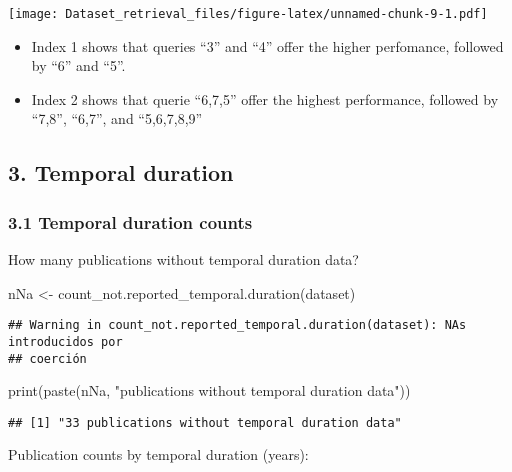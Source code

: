 \documentclass[
]{article}
\newenvironment{Shaded}{\begin{snugshade}}{\end{snugshade}}
\newcommand{\FunctionTok}[1]{\textcolor[rgb]{0.00,0.00,0.00}{#1}}
\newcommand{\NormalTok}[1]{#1}
\newcommand{\OtherTok}[1]{\textcolor[rgb]{0.56,0.35,0.01}{#1}}
\newcommand{\StringTok}[1]{\textcolor[rgb]{0.31,0.60,0.02}{#1}}
\begin{document}
\texttt{[image: Dataset\_retrieval\_files/figure-latex/unnamed-chunk-9-1.pdf]}

\begin{itemize}
\item
  Index 1 shows that queries ``3'' and ``4'' offer the higher
  perfomance, followed by ``6'' and ``5''.
\item
  Index 2 shows that querie ``6,7,5'' offer the highest performance,
  followed by ``7,8'', ``6,7'', and ``5,6,7,8,9''
\end{itemize}

\hypertarget{temporal-duration}{%
\subsection{3. Temporal duration}\label{temporal-duration}}

\hypertarget{temporal-duration-counts}{%
\subsubsection{3.1 Temporal duration
counts}\label{temporal-duration-counts}}

How many publications without temporal duration data?

\begin{Shaded}
\begin{Highlighting}[]
\NormalTok{nNa }\OtherTok{\textless{}{-}} \FunctionTok{count\_not.reported\_temporal.duration}\NormalTok{(dataset)}
\end{Highlighting}
\end{Shaded}

\begin{verbatim}
## Warning in count_not.reported_temporal.duration(dataset): NAs introducidos por
## coerción
\end{verbatim}

\begin{Shaded}
\begin{Highlighting}[]
\FunctionTok{print}\NormalTok{(}\FunctionTok{paste}\NormalTok{(nNa, }\StringTok{"publications without temporal duration data"}\NormalTok{))}
\end{Highlighting}
\end{Shaded}

\begin{verbatim}
## [1] "33 publications without temporal duration data"
\end{verbatim}

Publication counts by temporal duration (years):
\end{document}
